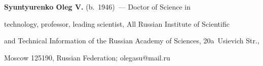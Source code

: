     

    \Contrl

    

      \noindent

      \textbf{Syuntyurenko Oleg V.} (b.\ 1946)~--- Doctor of Science in 

technology, professor, leading scientist, All Russian Institute of Scientific 

and Technical Information of the Russian Academy of Sciences, 20a~Usievich Str., 

Moscow 125190, Russian Federation; \mbox{olegasu@mail.ru}

   \label{end\stat}





\renewcommand{\bibname}{\protect\rm Литература} 

     

